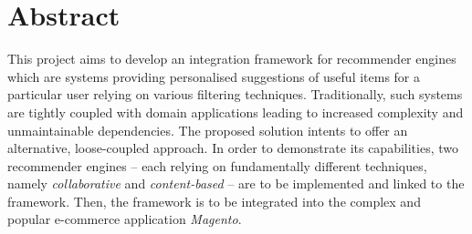 \chapter*{Abstract}

This project aims to develop an integration framework for recommender engines which are systems providing personalised suggestions of useful items for a particular user relying on various filtering techniques. Traditionally, such systems are tightly coupled with domain applications leading to increased complexity and unmaintainable dependencies. The proposed solution intents to offer an alternative, loose-coupled approach. In order to demonstrate its capabilities, two recommender engines -- each relying on fundamentally different techniques, namely \emph{collaborative} and \emph{content-based} -- are to be implemented and linked to the framework. Then, the framework is to be integrated into the complex and popular e-commerce application \emph{Magento}.